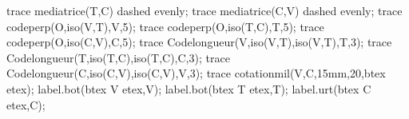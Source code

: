 \begin{corrige}
\begin{enumerate}
\begin{Geometrie}[CoinBG={(-u,-0.5u)},CoinHD={(4.8u,4.8u)}]
         trace mediatrice(T,C) dashed evenly;
         trace mediatrice(C,V) dashed evenly;
         trace codeperp(O,iso(V,T),V,5);
         trace codeperp(O,iso(T,C),T,5);
         trace codeperp(O,iso(C,V),C,5);
         trace Codelongueur(V,iso(V,T),iso(V,T),T,3);
         trace Codelongueur(T,iso(T,C),iso(T,C),C,3);
         trace Codelongueur(C,iso(C,V),iso(C,V),V,3);
         trace cotationmil(V,C,15mm,20,btex  etex);
         label.bot(btex V etex,V);
         label.bot(btex T etex,T);
         label.urt(btex C etex,C);
         \end{Geometrie}
\end{enumerate}
\end{corrige}
